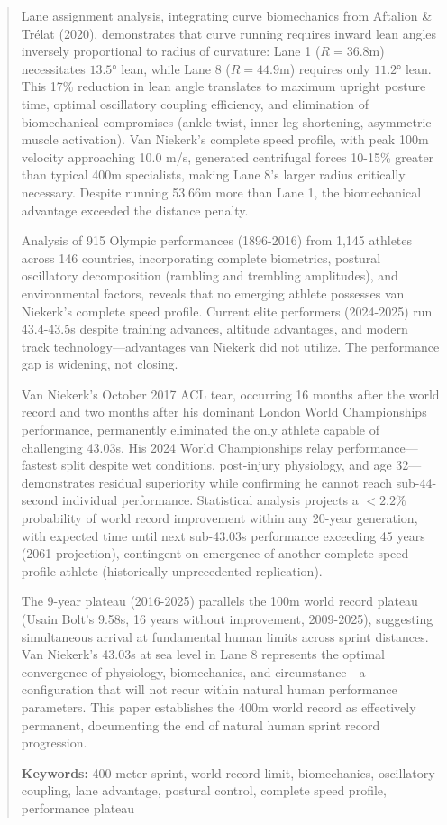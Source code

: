\documentclass[twocolumn,10pt]{article}
\begin{document}
\begin{abstract}
Lane assignment analysis, integrating curve biomechanics from Aftalion \& Trélat (2020), demonstrates that curve running requires inward lean angles inversely proportional to radius of curvature: Lane 1 ($R = 36.8$m) necessitates $13.5°$ lean, while Lane 8 ($R = 44.9$m) requires only $11.2°$ lean. This 17\% reduction in lean angle translates to maximum upright posture time, optimal oscillatory coupling efficiency, and elimination of biomechanical compromises (ankle twist, inner leg shortening, asymmetric muscle activation). Van Niekerk's complete speed profile, with peak 100m velocity approaching 10.0 m/s, generated centrifugal forces 10-15\% greater than typical 400m specialists, making Lane 8's larger radius critically necessary. Despite running 53.66m more than Lane 1, the biomechanical advantage exceeded the distance penalty.

Analysis of 915 Olympic performances (1896-2016) from 1,145 athletes across 146 countries, incorporating complete biometrics, postural oscillatory decomposition (rambling and trembling amplitudes), and environmental factors, reveals that no emerging athlete possesses van Niekerk's complete speed profile. Current elite performers (2024-2025) run 43.4-43.5s despite training advances, altitude advantages, and modern track technology—advantages van Niekerk did not utilize. The performance gap is widening, not closing.

Van Niekerk's October 2017 ACL tear, occurring 16 months after the world record and two months after his dominant London World Championships performance, permanently eliminated the only athlete capable of challenging 43.03s. His 2024 World Championships relay performance—fastest split despite wet conditions, post-injury physiology, and age 32—demonstrates residual superiority while confirming he cannot reach sub-44-second individual performance. Statistical analysis projects a $< 2.2\%$ probability of world record improvement within any 20-year generation, with expected time until next sub-43.03s performance exceeding 45 years (2061 projection), contingent on emergence of another complete speed profile athlete (historically unprecedented replication).

The 9-year plateau (2016-2025) parallels the 100m world record plateau (Usain Bolt's 9.58s, 16 years without improvement, 2009-2025), suggesting simultaneous arrival at fundamental human limits across sprint distances. Van Niekerk's 43.03s at sea level in Lane 8 represents the optimal convergence of physiology, biomechanics, and circumstance—a configuration that will not recur within natural human performance parameters. This paper establishes the 400m world record as effectively permanent, documenting the end of natural human sprint record progression.

\textbf{Keywords:} 400-meter sprint, world record limit, biomechanics, oscillatory coupling, lane advantage, postural control, complete speed profile, performance plateau
\end{abstract}
\end{document}
